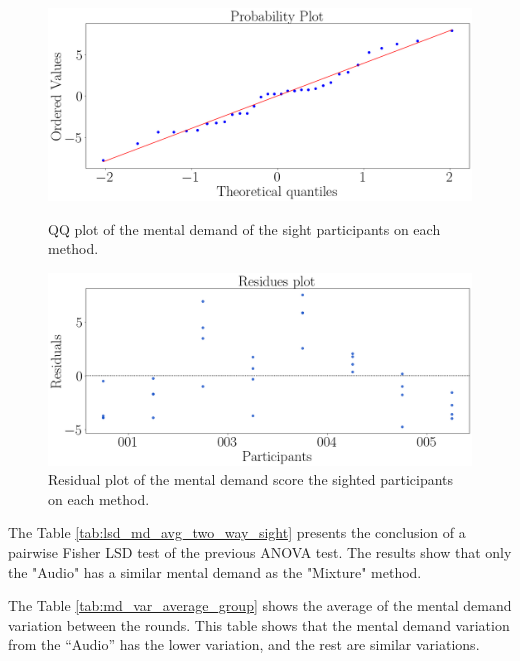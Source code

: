 \begin{figure}[!htb]
    \centering
    \begin{minipage}{0.45\textwidth}
        \centering
        \includegraphics[width = 0.8\linewidth]{Resultados/Nasa/Figuras/png/qqplot_md_avg_two_way_sight.png}
        \caption{QQ plot of the mental demand of the sight participants on each method.}
        \label{fig:qqplot_md_avg_two_way_sight}
    \end{minipage}
    \begin{minipage}{0.45\textwidth}
        \centering
        \includegraphics[width = 0.8\linewidth]{Resultados/Nasa/Figuras/png/residplot_md_avg_two_way_sight.png}
        \caption{Residual plot of the mental demand score the sighted participants on each method.}
        \label{fig:residplot_md_avg_two_way_sight}
    \end{minipage}
\end{figure}

The Table \ref{tab:lsd_md_avg_two_way_sight} presents the conclusion of a pairwise Fisher LSD test of the previous ANOVA test. The results show that only the "Audio" has a similar mental demand as the "Mixture" method.



The Table \ref{tab:md_var_average_group} shows the average of the mental demand variation between the rounds. This table shows that the mental demand variation from the “Audio” has the lower variation, and the rest are similar variations.

